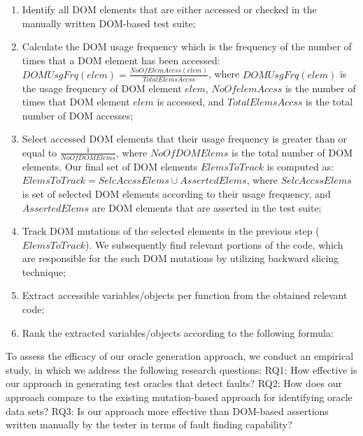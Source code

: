 \begin{enumerate}
\item Identify all DOM elements
that are either accessed or checked in the manually written DOM-based test suite; 
\item Calculate the DOM usage frequency which is the frequency of the number of times that a DOM element has been accessed:
$DOMUsgFrq(elem)=\frac{NoOfElemAccss(elem)}{TotalElemsAccss}$, where $DOMUsgFrq(elem)$ is the usage frequency of DOM element $elem$, $NoOfelemAccss$ is the number of times that DOM element $elem$ is accessed, and $TotalElemsAccss$ is the total number of DOM accesses;
\item Select accessed DOM elements that their usage frequency is greater than or equal to $\frac{1}{NoOfDOMElems}$, where $NoOfDOMElems$ is the total number of DOM elements. Our final set of DOM elements $ElemsToTrack$ is computed as:
$ElemsToTrack=SelcAccssElems\cup AssertedElems$, where $SelcAccssElems$ is set of selected DOM elements according to their usage frequency, and $AssertedElems$ are DOM elements that are asserted in the test suite;    
\item Track DOM
mutations of the selected elements in the previous step ($ElemsToTrack$). We subsequently find relevant portions of the code, which are responsible for the such DOM mutations by utilizing backward slicing technique; 
\item Extract accessible variables/objects per function from the obtained relevant code;
\item Rank the extracted variables/objects according to the following formula:
\end{enumerate}

To assess the efficacy of our oracle generation approach, we conduct an empirical study, in
which we address the following research questions:
RQ1: How effective is our approach in generating test oracles that detect faults?
RQ2: How does our approach compare to the existing mutation-based approach for identifying
oracle data sets?
RQ3: Is our approach more effective than DOM-based assertions written manually by the tester
in terms of fault finding capability?